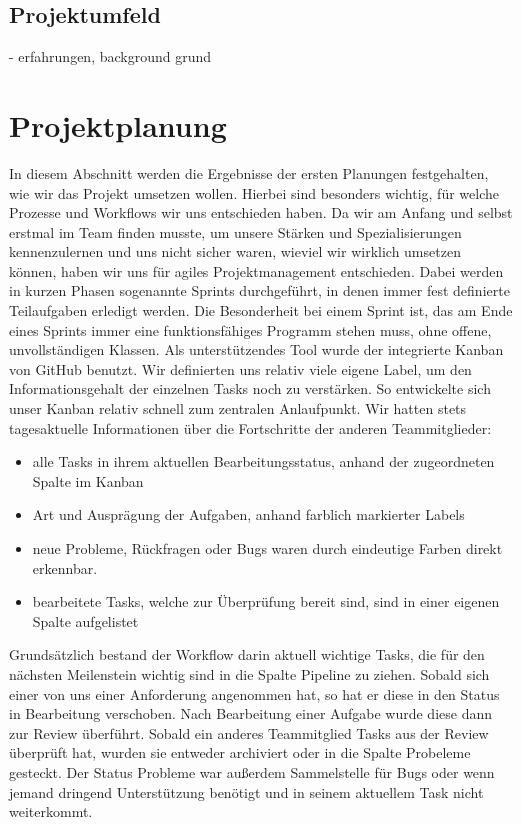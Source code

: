 \documentclass[12pt]{article}
\begin{document}
\subsection{Projektumfeld}
- erfahrungen, background
 grund


\newpage
\section{Projektplanung}

In diesem Abschnitt werden die Ergebnisse der ersten Planungen festgehalten, wie wir das Projekt umsetzen wollen. Hierbei sind besonders wichtig, für welche Prozesse und Workflows wir uns entschieden haben. \newline
Da wir am Anfang und selbst erstmal im Team finden musste, um unsere Stärken und Spezialisierungen kennenzulernen und uns nicht sicher waren, wieviel wir wirklich umsetzen können, haben wir uns für agiles Projektmanagement entschieden. Dabei werden in kurzen Phasen sogenannte Sprints durchgeführt, in denen immer fest definierte Teilaufgaben erledigt werden. Die Besonderheit bei einem Sprint ist, das am Ende eines Sprints immer eine funktionsfähiges Programm stehen muss, ohne offene, unvollständigen Klassen. \newline
Als unterstützendes Tool wurde der integrierte Kanban von GitHub benutzt. Wir definierten uns relativ viele eigene Label, um den Informationsgehalt der einzelnen Tasks noch zu verstärken.
So entwickelte sich unser Kanban relativ schnell zum zentralen Anlaufpunkt. Wir hatten stets tagesaktuelle Informationen über die Fortschritte der anderen Teammitglieder:
\begin{itemize}
	\item alle Tasks in ihrem aktuellen Bearbeitungsstatus, anhand der zugeordneten Spalte im Kanban
	\item Art und Ausprägung der Aufgaben, anhand farblich markierter Labels
	\item neue Probleme, Rückfragen oder Bugs waren durch eindeutige Farben direkt erkennbar.
	\item bearbeitete Tasks, welche zur Überprüfung bereit sind, sind in einer eigenen Spalte aufgelistet
\end{itemize}
Grundsätzlich bestand der Workflow darin aktuell wichtige Tasks, die für den nächsten Meilenstein wichtig sind in die Spalte \glqq Pipeline\grqq{} zu ziehen. Sobald sich einer von uns einer Anforderung angenommen hat, so hat er diese in den Status \glqq in Bearbeitung\grqq{} verschoben. Nach Bearbeitung einer Aufgabe wurde diese dann zur \glqq Review\grqq{} überführt. Sobald ein anderes Teammitglied Tasks aus der \glqq Review\grqq{} überprüft hat, wurden sie entweder archiviert oder in die Spalte \glqq Probeleme\grqq{} gesteckt. Der Status \glqq Probleme\grqq{} war außerdem Sammelstelle für Bugs oder wenn jemand dringend Unterstützung benötigt und in seinem aktuellem Task nicht weiterkommt.
\end{document}
